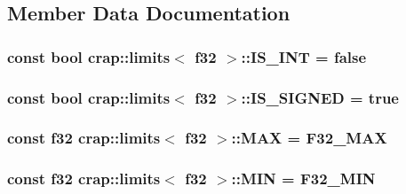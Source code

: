 \subsection{Member Data Documentation}
\hypertarget{structcrap_1_1limits_3_01f32_01_4_a131c2fe141a0c04d5140850158a0cf2d}{
\subsubsection[{I\-S\-\_\-\-I\-N\-T}]{\setlength{\rightskip}{0pt plus 5cm}const bool {\bf crap\-::limits}$<$ {\bf f32} $>$\-::I\-S\-\_\-\-I\-N\-T = false\hspace{0.3cm}{\ttfamily [static]}}}\label{structcrap_1_1limits_3_01f32_01_4_a131c2fe141a0c04d5140850158a0cf2d}
\hypertarget{structcrap_1_1limits_3_01f32_01_4_a934f89c2f787b2d0f39a52ab4e0052b4}{
\subsubsection[{I\-S\-\_\-\-S\-I\-G\-N\-E\-D}]{\setlength{\rightskip}{0pt plus 5cm}const bool {\bf crap\-::limits}$<$ {\bf f32} $>$\-::I\-S\-\_\-\-S\-I\-G\-N\-E\-D = true\hspace{0.3cm}{\ttfamily [static]}}}\label{structcrap_1_1limits_3_01f32_01_4_a934f89c2f787b2d0f39a52ab4e0052b4}
\hypertarget{structcrap_1_1limits_3_01f32_01_4_afea4f89ade14e316c4bb667d7647ca69}{
\subsubsection[{M\-A\-X}]{\setlength{\rightskip}{0pt plus 5cm}const {\bf f32} {\bf crap\-::limits}$<$ {\bf f32} $>$\-::M\-A\-X = {\bf F32\-\_\-\-M\-A\-X}\hspace{0.3cm}{\ttfamily [static]}}}\label{structcrap_1_1limits_3_01f32_01_4_afea4f89ade14e316c4bb667d7647ca69}
\hypertarget{structcrap_1_1limits_3_01f32_01_4_abf95b25d77cebc19337b8e65709f837d}{
\subsubsection[{M\-I\-N}]{\setlength{\rightskip}{0pt plus 5cm}const {\bf f32} {\bf crap\-::limits}$<$ {\bf f32} $>$\-::M\-I\-N = {\bf F32\-\_\-\-M\-I\-N}\hspace{0.3cm}{\ttfamily [static]}}}\label{structcrap_1_1limits_3_01f32_01_4_abf95b25d77cebc19337b8e65709f837d}


